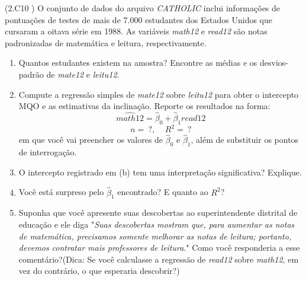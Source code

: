 \documentclass[12pt,letterpaper, onecolumn]{exam}
\begin{document}
\begin{questions}



    \question (2.C10 \citep{wooldridge2016}) O conjunto de dados do arquivo \textit{CATHOLIC} inclui informações de pontuações de testes de mais de 7.000 estudantes dos Estados Unidos que cursaram a oitava série em 1988. As variáveis \textit{math12} e \textit{read12} são notas padronizadas de matemática e leitura, respectivamente.
            \begin{enumerate}[label = (\alph*)]
            \item Quantos estudantes existem na amostra? Encontre as médias e os desvios-padrão de \textit{mate12} e \textit{leitu12}.
            \item Compute a regressão simples de \textit{mate12} sobre \textit{leitu12} para obter o intercepto MQO e as estimativas da inclinação. Reporte os resultados na forma: \begin{equation*}
                \widehat{math12} = \hat\beta_0 + \hat\beta_1read12
            \end{equation*} \begin{equation*}
                n = \ ?, \ \ \ \ \  R^2 = \     ?
            \end{equation*} em que você vai preencher os valores de $\hat\beta_0$ e $\hat\beta_1$, além de substituir os pontos de interrogação.
            \item O intercepto registrado em (b) tem uma interpretação significativa? Explique.
            \item Você está surpreso pelo $\hat\beta_1$ encontrado? E quanto ao $R^2$?
            \item Suponha que você apresente suas descobertas ao superintendente distrital de educação e ele diga "\textit{Suas descobertas mostram que, para aumentar as notas de matemática, precisamos somente melhorar as notas de leitura; portanto, devemos contratar mais professores de leitura}." Como você responderia a esse comentário?(Dica: Se você calculasse a regressão de \textit{read12} sobre \textit{math12}, em vez do contrário, o que esperaria descobrir?)
            \end{enumerate}


\end{questions}
\end{document}
